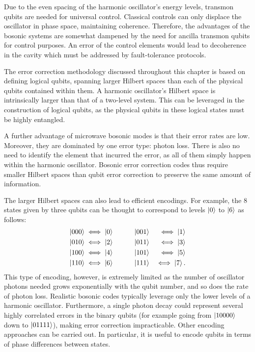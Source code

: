 Due to the even spacing of the harmonic oscillator's energy levels, transmon qubits are needed for universal control. Classical controls can only displace the oscillator in phase space, maintaining coherence. Therefore, the advantages of the bosonic systems are somewhat dampened by the need for ancilla transmon qubits for control purposes. An error of the control elements would lead to decoherence in the cavity which must be addressed by fault-tolerance protocols.

The error correction methodology discussed throughout this chapter is based on defining logical qubits, spanning larger Hilbert spaces than each of the physical qubits contained within them. A harmonic oscillator's Hilbert space is intrinsically larger than that of a two-level system. This can be leveraged in the construction of logical qubits, as the physical qubits in these logical states must be highly entangled.

A further advantage of microwave bosonic modes is that their error rates are low. Moreover, they are dominated by one error type: photon loss. There is also no need to identify the element that incurred the error, as all of them simply happen within the harmonic oscillator. Bosonic error correction codes thus require smaller Hilbert spaces than qubit error correction to preserve the same amount of information.

The larger Hilbert spaces can also lead to efficient encodings. For example, the 8 states given by three qubits can be thought to correspond to levels $\ket{0}$ to $\ket{6}$ as follows:
\begin{eqnarray}
    \ket{000} & \iff \ket{0} \qquad \quad \ket{001} & \iff \ket{1} \notag\\ 
    \ket{010} & \iff \ket{2} \qquad \quad \ket{011} & \iff \ket{3} \notag\\
    \ket{100} & \iff \ket{4} \qquad \quad \ket{101} & \iff \ket{5} \notag\\
    \ket{110} & \iff \ket{6} \qquad \quad \ket{111} & \iff \ket{7}.
\end{eqnarray}
This type of encoding, however, is extremely limited as the number of oscillator photons needed grows exponentially with the qubit number, and so does the rate of photon loss. Realistic bosonic codes typically leverage only the lower levels of a harmonic oscillator. Furthermore, a single photon decay could represent several highly correlated errors in the binary qubits (for example going from $\ket{10000}$ down to $\ket{01111}$), making error correction impracticable. Other encoding approaches can be carried out. In particular, it is useful to encode qubits in terms of phase differences between states. 

